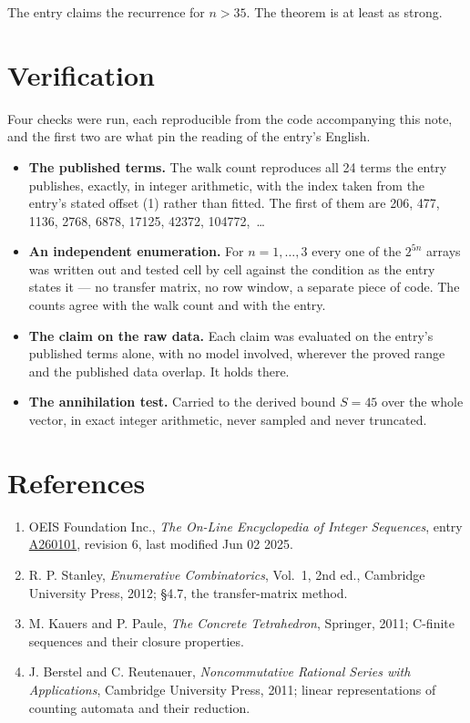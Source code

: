 \documentclass[11pt]{article}
\theoremstyle{definition}
\begin{document}
The entry claims the recurrence for $n > 35$. The theorem is at least as strong.

\section{Verification}

Four checks were run, each reproducible from the code accompanying this note, and the first two are what pin the reading of the entry's English.

\begin{itemize}

\item {\bfseries The published terms.} The walk count reproduces all 24 terms the entry publishes, exactly, in integer arithmetic, with the index taken from the entry's stated offset (1) rather than fitted. The first of them are 206, 477, 1136, 2768, 6878, 17125, 42372, 104772,~\dots

\item {\bfseries An independent enumeration.} For $n = 1,\dots,3$ every one of the $2^{5n}$ arrays was written out and tested cell by cell against the condition as the entry states it --- no transfer matrix, no row window, a separate piece of code. The counts agree with the walk count and with the entry.

\item {\bfseries The claim on the raw data.} Each claim was evaluated on the entry's published terms alone, with no model involved, wherever the proved range and the published data overlap. It holds there.

\item {\bfseries The annihilation test.} Carried to the derived bound $S = 45$ over the whole vector, in exact integer arithmetic, never sampled and never truncated.

\end{itemize}

\section{References}

\begin{enumerate}

\item OEIS Foundation Inc., \emph{The On-Line Encyclopedia of Integer Sequences}, entry \href{https://oeis.org/A260101}{A260101}, revision 6, last modified Jun 02 2025.

\item R. P. Stanley, \emph{Enumerative Combinatorics}, Vol.~1, 2nd ed., Cambridge University Press, 2012; \S4.7, the transfer-matrix method.

\item M. Kauers and P. Paule, \emph{The Concrete Tetrahedron}, Springer, 2011; C-finite sequences and their closure properties.

\item J. Berstel and C. Reutenauer, \emph{Noncommutative Rational Series with Applications}, Cambridge University Press, 2011; linear representations of counting automata and their reduction.

\end{enumerate}
\end{document}
